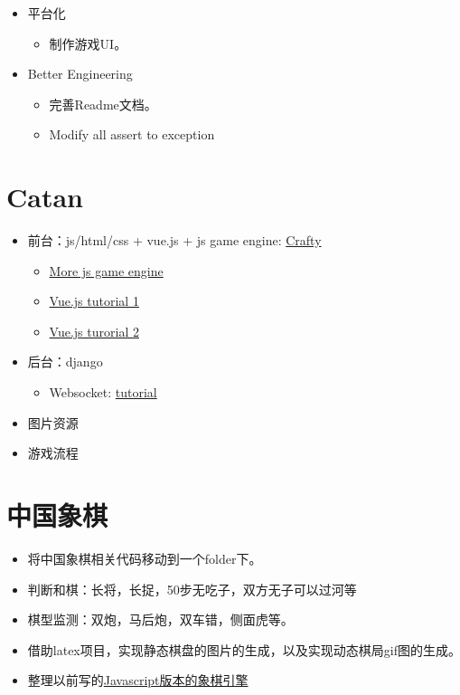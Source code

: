 \documentclass[export, 12pt, letterpaper]{ctexrep}
\begin{document}
\begin{itemize}
\item{ 平台化
\begin{itemize}
\item{ 制作游戏UI。 }
\end{itemize}
 }
\item{ Better Engineering
\begin{itemize}
\item{ 完善Readme文档。 }
\item{ Modify all assert to exception }
\end{itemize}
 }
\end{itemize}


\section{Catan}

\begin{itemize}
\item{ 前台：js/html/css + vue.js + js game engine: \href{https://github.com/craftyjs/Crafty}{Crafty}
\begin{itemize}
\item{ \href{https://github.com/collections/javascript-game-engines}{More js game engine} }
\item{ \href{https://www.youtube.com/watch?v=bI5jpueiCWw\&t=756s}{Vue.js tutorial 1} }
\item{ \href{https://www.youtube.com/watch?v=xq532yn8gMA\&t=2608s}{Vue.js turorial 2} }
\end{itemize}
 }
\item{ 后台：django
\begin{itemize}
\item{ Websocket: \href{https://www.youtube.com/watch?v=RVH05S1qab8\&list=PLcWimtlf9naWeyuY5OwQeaRNxvxTRyTCt\&index=1\&t=3148s}{tutorial} }
\end{itemize}
 }
\item{ 图片资源 }
\item{ 游戏流程 }
\end{itemize}



\section{中国象棋}


\begin{itemize}
\item{ 将中国象棋相关代码移动到一个folder下。 }
\item{ 判断和棋：长将，长捉，50步无吃子，双方无子可以过河等 }
\item{ 棋型监测：双炮，马后炮，双车错，侧面虎等。 }
\item{ 借助latex项目，实现静态棋盘的图片的生成，以及实现动态棋局gif图的生成。 }
\item{ 整理以前写的\href{https://github.com/JimmyFromSYSU/ChineseChess}{Javascript版本的象棋引擎} }
\end{itemize}
\end{document}
